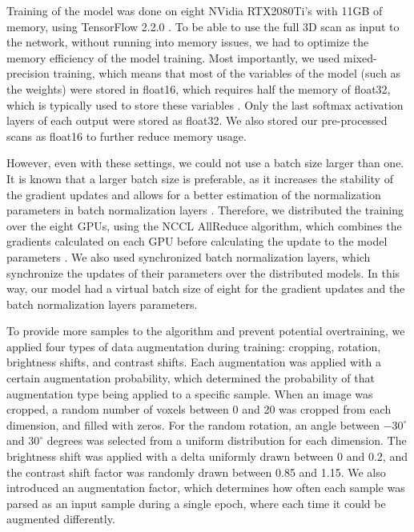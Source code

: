Training of the model was done on eight NVidia RTX2080Ti's with 11GB of memory, using TensorFlow 2.2.0 \autocite{abadi2016tensorflow}.
To be able to use the full 3D scan as input to the network, without running into memory issues, we had to optimize the memory efficiency of the model training.
Most importantly, we used mixed-precision training, which means that most of the variables of the model (such as the weights) were stored in float16, which requires half the memory of float32, which is typically used to store these variables \autocite{das2018mixed}.
Only the last softmax activation layers of each output were stored as float32.
We also stored our pre-processed scans as float16 to further reduce memory usage.

However, even with these settings, we could not use a batch size larger than one.
It is known that a larger batch size is preferable, as it increases the stability of the gradient updates and allows for a better estimation of the normalization parameters in batch normalization layers \autocite{smith2018batch}.
Therefore, we distributed the training over the eight GPUs, using the NCCL AllReduce algorithm, which combines the gradients calculated on each GPU before calculating the update to the model parameters \autocite{woolleynccl}.
We also used synchronized batch normalization layers, which synchronize the updates of their parameters over the distributed models.
In this way, our model had a virtual batch size of eight for the gradient updates and the batch normalization layers parameters.

To provide more samples to the algorithm and prevent potential overtraining, we applied four types of data augmentation during training: cropping, rotation, brightness shifts, and contrast shifts.
Each augmentation was applied with a certain augmentation probability, which determined the probability of that augmentation type being applied to a specific sample.
When an image was cropped, a random number of voxels between 0 and 20 was cropped from each dimension, and filled with zeros.
For the random rotation, an angle between $-30^{\circ}$ and $30^{\circ}$ degrees was selected from a uniform distribution for each dimension.
The brightness shift was applied with a delta uniformly drawn between \num{0} and \num{0.2}, and the contrast shift factor was randomly drawn between \num{0.85} and \num{1.15}.
We also introduced an augmentation factor, which determines how often each sample was parsed as an input sample during a single epoch, where each time it could be augmented differently.

